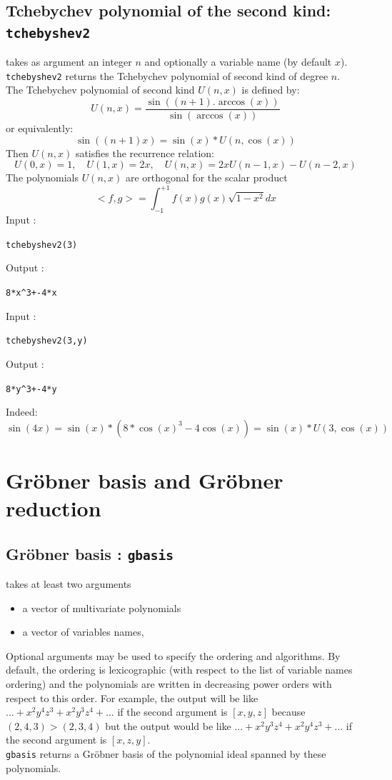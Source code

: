 \documentclass[a4paper,11pt]{book}
\begin{document}
\subsection{Tchebychev polynomial of the second kind: {\tt tchebyshev2}}
 takes as argument an integer $n$ and optionally  
a variable name (by default $x$).\\
{\tt tchebyshev2} returns the Tchebychev polynomial of second kind
of degree $n$.\\
The Tchebychev polynomial of second kind $U(n,x)$ is defined by:
$$U(n,x)=\frac{\sin((n+1).\arccos(x))}{\sin(\arccos(x))}$$
or equivalently:
$$\sin((n+1)x)=\sin(x)*U(n,\cos(x))$$ 
Then $U(n,x)$ satisfies the recurrence relation:
\[ U(0,x)=1, \quad
U(1,x)=2x, \quad
U(n,x)=2xU(n-1,x)-U(n-2,x) \]
The polynomials $U(n,x)$ are orthogonal for the scalar product
\[ <f,g>=\int_{-1}^{+1}f(x)g(x)\sqrt{1-x^2}dx \]
Input :
\begin{center}{\tt tchebyshev2(3)}\end{center}
Output :
\begin{center}{\tt 8*x\verb|^|3+-4*x}\end{center}
Input :
\begin{center}{\tt tchebyshev2(3,y)}\end{center}
Output :
\begin{center}{\tt 8*y\verb|^|3+-4*y}\end{center}
Indeed:
\[ \sin(4 x)=\sin(x)*(8*\cos(x)^3-4 \cos(x))=\sin(x)*U(3,\cos(x)) \]



\section{Gr\"obner basis and Gr\"obner reduction}
 \subsection{Gr\"obner basis : {\tt gbasis}}
\label{sec:gbasis}
 takes at least two arguments
\begin{itemize}
\item a vector of multivariate polynomials 
\item a vector of variables names,
\end{itemize}
Optional arguments may be used to specify the ordering and
algorithms. By default, the ordering is lexicographic (with respect to the
list of variable names ordering)
and the polynomials are written in decreasing power orders with
respect to this order. 
For example, the output will be like 
$...+x^2 y^4 z^3+x^2 y^3 z^4+...$ if the second argument is $[x,y,z]$ because
$(2,4,3)>(2,3,4)$ but the output would be like
$...+x^2 y^3z^4+x^2 y^4 z^3+...$  if the second argument is $[x,z,y]$.\\
{\tt gbasis} returns a Gr\"obner basis of the polynomial ideal spanned
by these polynomials.
\end{document}
